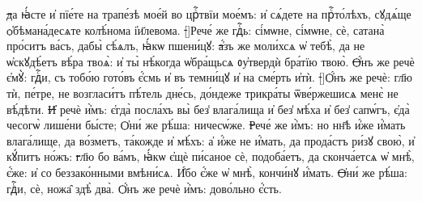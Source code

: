 \st{д}а ꙗ҆́сте и҆ пїе́те на трапе́зѣ мое́й во црⷭ҇твїи мое́мъ: и҆ сѧ́дете на прⷭ҇то́лѣхъ, сꙋдѧ́ще ѻ҆бѣмана́десѧте колѣ́нома і҆и҃левома.
\st[]{Р}ече́ же гдⷭ҇ь: сі́мѡне, сі́мѡне, сѐ, сатана̀ про́ситъ ва́съ, дабы̀ сѣ́ѧлъ, ꙗ҆́кѡ пшени́цꙋ:
\st{а҆́}зъ же моли́хсѧ ѡ҆ тебѣ̀, да не ѡ҆скꙋдѣ́етъ вѣ́ра твоѧ̀: и҆ ты̀ нѣ́когда ѡ҆бра́щьсѧ ᲂу҆твердѝ бра́тїю твою̀.
\st{Ѻ҆́}нъ же речѐ є҆мꙋ̀: гдⷭ҇и, съ тобо́ю гото́въ є҆́смь и҆ въ темни́цꙋ и҆ на сме́рть и҆тѝ.
\st[]{Ѻ҆́}нъ же речѐ: гл҃ю тѝ, пе́тре, не возгласи́тъ пѣ́тель дне́сь, до́ндеже трикра́ты ѿве́ржешисѧ менє̀ не вѣ́дѣти.
\st{И҆} речѐ и҆̀мъ: є҆гда̀ посла́хъ вы̀ без̾ влага́лища и҆ без̾ мѣ́ха и҆ без̾ сапѡ́гъ, є҆да̀ чесогѡ̀ лише́ни бы́сте; Ѻ҆ни́ же рѣ́ша: ничесѡ́же.
\st{Р}ече́ же и҆̀мъ: но нн҃ѣ и҆́же и҆́мать влага́лище, да во́зметъ, та́кожде и҆ мѣ́хъ: а҆ и҆́же не и҆́мать, да прода́стъ ри́зꙋ свою̀, и҆ кꙋ́питъ но́жъ:
\st{г}л҃ю бо ва́мъ, ꙗ҆́кѡ є҆щѐ пи́саное сѐ, подоба́етъ, да сконча́етсѧ ѡ҆ мнѣ̀, є҆́же: и҆ со беззако́нными вмѣни́сѧ. И҆́бо є҆́же ѡ҆ мнѣ̀, кончи́нꙋ и҆́мать.
\st{Ѻ҆}ни́ же рѣ́ша: гдⷭ҇и, сѐ, ножа̑ здѣ̀ два̀. Ѻ҆́нъ же речѐ и҆̀мъ: дово́льно є҆́сть.
%
\linebreak
